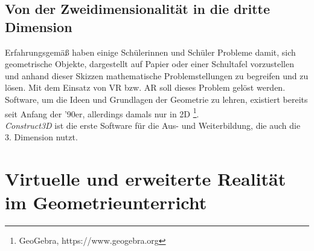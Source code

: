 \documentclass[deutsch]{llncs}
\begin{document}
\subsection{Von der Zweidimensionalität in die dritte Dimension}
Erfahrungsgemäß haben einige Schülerinnen und Schüler Probleme damit, sich geometrische Objekte, dargestellt auf Papier oder einer Schultafel vorzustellen und anhand dieser Skizzen mathematische Problemstellungen zu begreifen und zu lösen. Mit dem Einsatz von VR bzw. AR soll dieses Problem gelöst werden.\\
Software, um die Ideen und Grundlagen der Geometrie zu lehren, existiert bereits seit Anfang der '90er, allerdings damals nur in 2D \footnote{GeoGebra, https://www.geogebra.org}. \\
\emph{Construct3D} ist die erste Software für die Aus- und Weiterbildung, die auch die 3. Dimension nutzt. %
\section{Virtuelle und erweiterte Realität im Geometrieunterricht}
\end{document}
